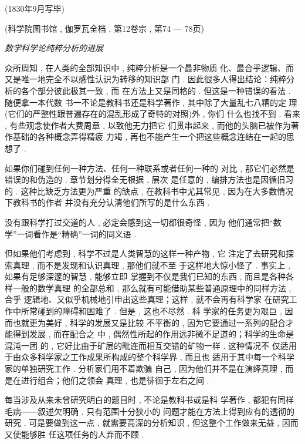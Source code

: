 \begin{flushright}
	(1830年9月写毕)
\end{flushright}

\begin{center}
	(科学院图书馆 , 伽罗瓦全档 ,  第12卷宗 , 第74 — 78页)
\end{center}

\begin{center}
	\emph{数学科学论纯粹分析的进展}
\end{center}

众所周知 , 在人类的全部知识中 , 纯粹分析是一个最非物质 化、最合乎逻辑、而又是唯一地完全不以感性认识为转移的知识部 门 . 因此很多人得出结论：纯粹分析的各个部分彼此极其一致 , 而 在方法上又是同格的 . 但这是一种错误的看法 . 随便拿一本代数 书一不论是教科书还是科学著作 , 其中除了大量乱七八糟的定 理(它们的严整性跟普遍存在的混乱形成了奇特的对照)外 , 你们 什么也找不到 . 看来 , 有些观念使作者大费周章 , 以致他无力把它 们贯串起来 , 而他的头脑已被作为著作基础的各种概念弄得精疲 力竭 , 再也不能产生一个把这些概念连结在一起的思想了 . 

如果你们碰到任何一种方法、任何一种联系或者任何一种的 对比 , 那它们必然是错误的和伪造的 . 章节划分得全无根据 , 层次 是任意的 , 编排方法也是因循旧习的 . 这种比缺乏方法更为严重 的缺点 , 在教科书中尤其常见 , 因为在大多数情况下教科书的作者 并没有充分认清他们所写的是什么东西 . 

没有跟科学打过交道的人 , 必定会感到这一切都很奇怪 , 因为 他们通常把“数学”一词看作是“精确”一词的同义语 . 

但如果他们考虑到 , 科学不过是人类智慧的这样一种产物 , 它 注定了去研究和探索真理 , 而不是发现和认识真理 , 那他们就不至 于这样地大惊小怪了 . 事实上 , 如果有足够深邃的智慧 , 能够立即 掌握到不仅是我们已知的东西 , 而且是各种各样一般的数学真理 的全部总和 , 那么就有可能借助某些普通原理中的同样方法 , 合乎 逻辑地、又似乎机械地引申出这些真理；这样 , 就不会再有科学家 在研究工作中所常碰到的障碍和困难了 . 但是 , 这也不尽然 . 科 学家的任务更为艰巨 , 因而也就更为美好 , 科学的发展又是比较 不平衡的 , 因为它要通过一系列的配合才能得到发展 , 而在配合之 中 , 偶然性所起的作用远非微不足道的；科学的生命是混沌一团 的 , 它好比由于矿层的毗连而相互交错的矿物一样 . 这种情况不 仅适用于由众多科学家之工作成果所构成的整个科学界 , 而且也 适用于其中每一个科学家的单独研究工作 . 分析家们用不着欺骗 自己 , 因为他们并不是在演绎真理 , 而是在进行组合；他们之领会 真理 , 也是徘徊于左右之间 . 

每当涉及从来未曾研究明白的题目时 , 不论是教科书或是科 学著作 , 都犯有同样毛病——叙述欠明确 . 只有范围十分狭小的 问题才能在方法上得到应有的透彻的研究 . 可是要做到这一点 ,  就需要高深的分析知识 , 但这整个工作做来无益 , 因而又使能够胜 任这项任务的人弃而不顾 . 

